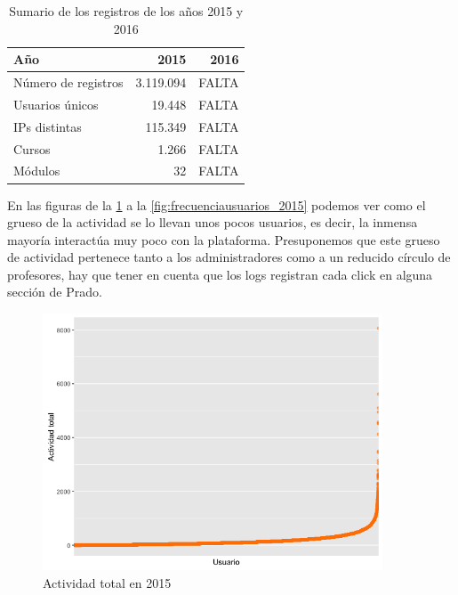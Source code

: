 \begin{table}[H]
\centering
\begin{tabular}{|l|r|r|}
\hline
\textbf{Año}        & \textbf{2015}	& \textbf{2016} \\ \hline
Número de registros & 3.119.094     	& FALTA				\\ \hline
Usuarios únicos     & 19.448        & FALTA				\\ \hline
IPs distintas       & 115.349       & FALTA				\\ \hline
Cursos              & 1.266         & FALTA				\\ \hline
Módulos             & 32            & FALTA				\\ \hline
\end{tabular}
\caption{Sumario de los registros de los años 2015 y 2016}
\label{table:sumarioregistros}
\end{table}

En las figuras de la \ref{fig:actividadtotal_2015} a la \ref{fig:frecuenciausuarios_2015} podemos ver como el grueso de la actividad se lo llevan unos pocos usuarios, es decir, la inmensa mayoría interactúa muy poco con la plataforma. Presuponemos que este grueso de actividad pertenece tanto a los administradores como a un reducido círculo de profesores, hay que tener en cuenta que los logs registran cada click en alguna sección de Prado.

\begin{figure}[H]
\centering
\includegraphics[width=0.9\textwidth]{../r/actividadtotal_2015}
\caption{Actividad total en 2015}
\label{fig:actividadtotal_2015}
\end{figure}

